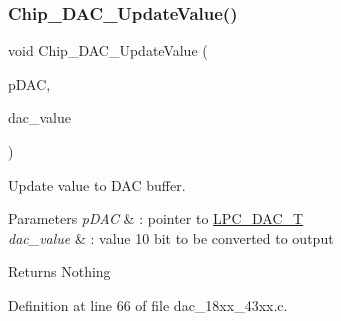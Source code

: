 \subsubsection{\texorpdfstring{Chip\+\_\+\+D\+A\+C\+\_\+\+Update\+Value()}{Chip\_DAC\_UpdateValue()}}
{\footnotesize\ttfamily void Chip\+\_\+\+D\+A\+C\+\_\+\+Update\+Value (\begin{DoxyParamCaption}\item[{\hyperlink{struct_l_p_c___d_a_c___t}{L\+P\+C\+\_\+\+D\+A\+C\+\_\+T} $\ast$}]{p\+D\+AC,  }\item[{uint32\+\_\+t}]{dac\+\_\+value }\end{DoxyParamCaption})}



Update value to D\+AC buffer. 


\begin{DoxyParams}{Parameters}
{\em p\+D\+AC} & \+: pointer to \hyperlink{struct_l_p_c___d_a_c___t}{L\+P\+C\+\_\+\+D\+A\+C\+\_\+T} \\
\hline
{\em dac\+\_\+value} & \+: value 10 bit to be converted to output \\
\hline
\end{DoxyParams}
\begin{DoxyReturn}{Returns}
Nothing 
\end{DoxyReturn}


Definition at line 66 of file dac\+\_\+18xx\+\_\+43xx.\+c.

